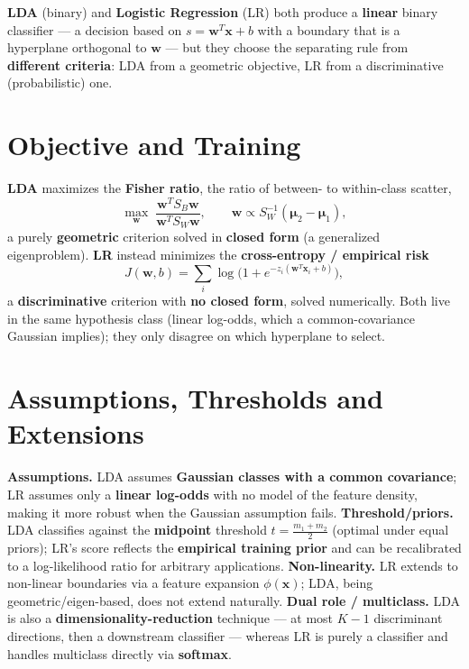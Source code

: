 \textbf{LDA} (binary) and \textbf{Logistic Regression} (LR) both produce a \textbf{linear} binary classifier --- a decision based on $s=\mathbf{w}^T\mathbf{x}+b$ with a boundary that is a hyperplane orthogonal to $\mathbf{w}$ --- but they choose the separating rule from \textbf{different criteria}: LDA from a geometric objective, LR from a discriminative (probabilistic) one.

\section*{Objective and Training}

\textbf{LDA} maximizes the \textbf{Fisher ratio}, the ratio of between- to within-class scatter,
\[
\max_{\mathbf{w}}\;\frac{\mathbf{w}^T S_B\mathbf{w}}{\mathbf{w}^T S_W\mathbf{w}},\qquad \mathbf{w}\propto S_W^{-1}(\boldsymbol{\mu}_2-\boldsymbol{\mu}_1),
\]
a purely \textbf{geometric} criterion solved in \textbf{closed form} (a generalized eigenproblem). \textbf{LR} instead minimizes the \textbf{cross-entropy / empirical risk}
\[
J(\mathbf{w},b)=\sum_i\log\!\big(1+e^{-z_i(\mathbf{w}^T\mathbf{x}_i+b)}\big),
\]
a \textbf{discriminative} criterion with \textbf{no closed form}, solved numerically. Both live in the same hypothesis class (linear log-odds, which a common-covariance Gaussian implies); they only disagree on which hyperplane to select.

\section*{Assumptions, Thresholds and Extensions}

\textbf{Assumptions.} LDA assumes \textbf{Gaussian classes with a common covariance}; LR assumes only a \textbf{linear log-odds} with no model of the feature density, making it more robust when the Gaussian assumption fails. \textbf{Threshold/priors.} LDA classifies against the \textbf{midpoint} threshold $t=\frac{m_1+m_2}{2}$ (optimal under equal priors); LR's score reflects the \textbf{empirical training prior} and can be recalibrated to a log-likelihood ratio for arbitrary applications. \textbf{Non-linearity.} LR extends to non-linear boundaries via a feature expansion $\phi(\mathbf{x})$; LDA, being geometric/eigen-based, does not extend naturally. \textbf{Dual role / multiclass.} LDA is also a \textbf{dimensionality-reduction} technique --- at most $K-1$ discriminant directions, then a downstream classifier --- whereas LR is purely a classifier and handles multiclass directly via \textbf{softmax}.

